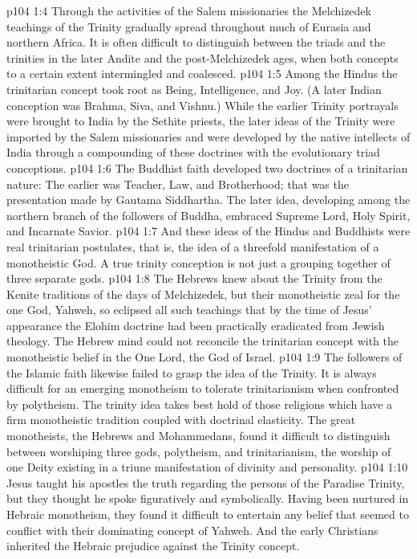 \vs p104 1:4 Through the activities of the Salem missionaries the Melchizedek teachings of the Trinity gradually spread throughout much of Eurasia and northern Africa. It is often difficult to distinguish between the triads and the trinities in the later Andite and the post\hyp{}Melchizedek ages, when both concepts to a certain extent intermingled and coalesced.
\vs p104 1:5 \pc Among the Hindus the trinitarian concept took root as Being, Intelligence, and Joy. (A later Indian conception was Brahma, Siva, and Vishnu.) While the earlier Trinity portrayals were brought to India by the Sethite priests, the later ideas of the Trinity were imported by the Salem missionaries and were developed by the native intellects of India through a compounding of these doctrines with the evolutionary triad conceptions.
\vs p104 1:6 The Buddhist faith developed two doctrines of a trinitarian nature: The earlier was Teacher, Law, and Brotherhood; that was the presentation made by Gautama Siddhartha. The later idea, developing among the northern branch of the followers of Buddha, embraced Supreme Lord, Holy Spirit, and Incarnate Savior.
\vs p104 1:7 And these ideas of the Hindus and Buddhists were real trinitarian postulates, that is, the idea of a threefold manifestation of a monotheistic God. A true trinity conception is not just a grouping together of three separate gods.
\vs p104 1:8 \pc The Hebrews knew about the Trinity from the Kenite traditions of the days of Melchizedek, but their monotheistic zeal for the one God, Yahweh, so eclipsed all such teachings that by the time of Jesus’ appearance the Elohim doctrine had been practically eradicated from Jewish theology. The Hebrew mind could not reconcile the trinitarian concept with the monotheistic belief in the One Lord, the God of Israel.
\vs p104 1:9 The followers of the Islamic faith likewise failed to grasp the idea of the Trinity. It is always difficult for an emerging monotheism to tolerate trinitarianism when confronted by polytheism. The trinity idea takes best hold of those religions which have a firm monotheistic tradition coupled with doctrinal elasticity. The great monotheists, the Hebrews and Mohammedans, found it difficult to distinguish between worshiping three gods, polytheism, and trinitarianism, the worship of one Deity existing in a triune manifestation of divinity and personality.
\vs p104 1:10 \pc Jesus taught his apostles the truth regarding the persons of the Paradise Trinity, but they thought he spoke figuratively and symbolically. Having been nurtured in Hebraic monotheism, they found it difficult to entertain any belief that seemed to conflict with their dominating concept of Yahweh. And the early Christians inherited the Hebraic prejudice against the Trinity concept.
